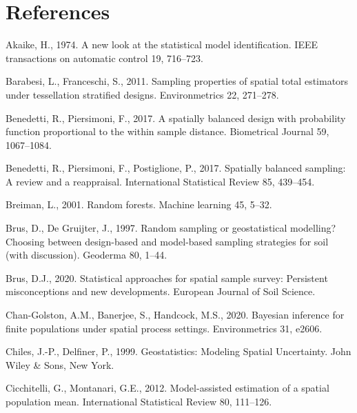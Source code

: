 \documentclass[]{elsarticle} %
\begin{document}
\hypertarget{references}{%
\section*{References}\label{references}}

\hypertarget{refs}{}
\leavevmode\hypertarget{ref-akaike1974new}{}%
Akaike, H., 1974. A new look at the statistical model identification.
IEEE transactions on automatic control 19, 716--723.

\leavevmode\hypertarget{ref-barabesi2011sampling}{}%
Barabesi, L., Franceschi, S., 2011. Sampling properties of spatial total
estimators under tessellation stratified designs. Environmetrics 22,
271--278.

\leavevmode\hypertarget{ref-benedetti2017spatially}{}%
Benedetti, R., Piersimoni, F., 2017. A spatially balanced design with
probability function proportional to the within sample distance.
Biometrical Journal 59, 1067--1084.

\leavevmode\hypertarget{ref-benedetti2017spatiallyreview}{}%
Benedetti, R., Piersimoni, F., Postiglione, P., 2017. Spatially balanced
sampling: A review and a reappraisal. International Statistical Review
85, 439--454.

\leavevmode\hypertarget{ref-breiman2001random}{}%
Breiman, L., 2001. Random forests. Machine learning 45, 5--32.

\leavevmode\hypertarget{ref-brus1997random}{}%
Brus, D., De Gruijter, J., 1997. Random sampling or geostatistical
modelling? Choosing between design-based and model-based sampling
strategies for soil (with discussion). Geoderma 80, 1--44.

\leavevmode\hypertarget{ref-brus2020statistical}{}%
Brus, D.J., 2020. Statistical approaches for spatial sample survey:
Persistent misconceptions and new developments. European Journal of Soil
Science.

\leavevmode\hypertarget{ref-chan2020bayesian}{}%
Chan-Golston, A.M., Banerjee, S., Handcock, M.S., 2020. Bayesian
inference for finite populations under spatial process settings.
Environmetrics 31, e2606.

\leavevmode\hypertarget{ref-chiles1999geostatistics}{}%
Chiles, J.-P., Delfiner, P., 1999. Geostatistics: Modeling Spatial
Uncertainty. John Wiley \& Sons, New York.

\leavevmode\hypertarget{ref-cicchitelli2012model}{}%
Cicchitelli, G., Montanari, G.E., 2012. Model-assisted estimation of a
spatial population mean. International Statistical Review 80, 111--126.
\end{document}
